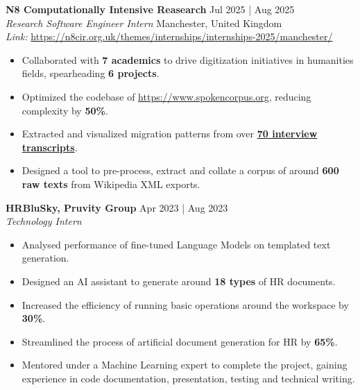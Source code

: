 \documentclass[a4paper,1.5pt]{extarticle}
\begin{document}
\textbf{N8 Computationally Intensive Reasearch} \hfill Jul 2025 | Aug 2025 \\ 
\textit{Research Software Engineer Intern} \hfill Manchester, United Kingdom \\ %
\textit{Link:} \url{https://n8cir.org.uk/themes/internships/internships-2025/manchester/}
\begin{itemize}
    \item Collaborated with \textbf{7 academics} to drive digitization initiatives in humanities fields, spearheading \textbf{6 projects}.
    \item Optimized the codebase of \url{https://www.spokencorpus.org}, reducing complexity by \textbf{50\%}.
    \item Extracted and visualized migration patterns from over \href{https://conflictmemorymigration.manchester.ac.uk/interviews/}{\textbf{70 interview transcripts}}. 
    \item Designed a tool to pre-process, extract and collate a corpus of around \textbf{600 raw texts} from Wikipedia XML exports.
\end{itemize}
\textbf{HRBluSky, Pruvity Group} \hfill Apr 2023 | Aug 2023 \\ %
\textit{Technology Intern}  %
\begin{itemize}
    \item Analysed performance of fine-tuned Language Models on templated text generation.
    \item Designed an AI assistant to generate around \textbf{18 types} of HR documents.
    \item Increased the efficiency of running basic operations around the workspace by \textbf{30\%}.
    \item Streamlined the process of artificial document generation for HR by \textbf{65\%}.
    \item Mentored under a Machine Learning expert to complete the project, gaining experience in code documentation, presentation, testing and technical writing.
\end{itemize}


\end{document}
